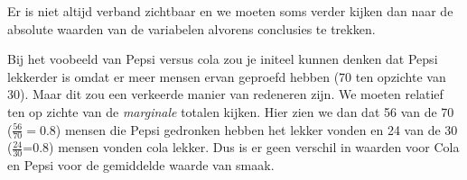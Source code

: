 Er is niet altijd verband zichtbaar en we moeten soms verder kijken dan naar de absolute waarden van de variabelen alvorens conclusies te trekken.

\begin{example}
	Bij het voobeeld van Pepsi versus cola zou je initeel kunnen denken dat Pepsi lekkerder is omdat er meer mensen ervan geproefd hebben (70 ten opzichte van 30). Maar dit zou een verkeerde manier van redeneren zijn. We moeten relatief ten op zichte van de  \textit{marginale} totalen kijken. Hier zien we dan dat 56 van de 70 ($\frac{56}{70} = 0.8$) mensen die Pepsi gedronken hebben het lekker vonden en 24 van de 30 ($\frac{24}{30}$=0.8) mensen vonden cola lekker. Dus is er geen verschil in waarden voor Cola en Pepsi voor de gemiddelde waarde van smaak. 
\end{example}
